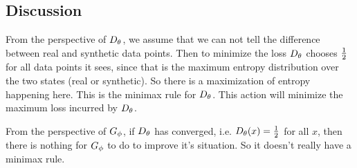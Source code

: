 \subsection{Discussion}

From the perspective of $D_\theta$, we assume that we can not tell the
difference between real and synthetic data points. Then to minimize
the loss $D_\theta$ chooses ${1 \over 2}$ for all data points it sees, since
that is the maximum entropy distribution over the two states (real or
synthetic). So there is a maximization of entropy happening here. This
is the minimax rule for $D_\theta$. This action will minimize the maximum
loss incurred by $D_\theta$.

From the perspective of $G_\phi$, if $D_\theta$ has converged, i.e. $D_\theta(x) =
{1 \over 2}$ for all $x$, then there is nothing for $G_\phi$ to do to
improve it's situation. So it doesn't really have a minimax rule.

